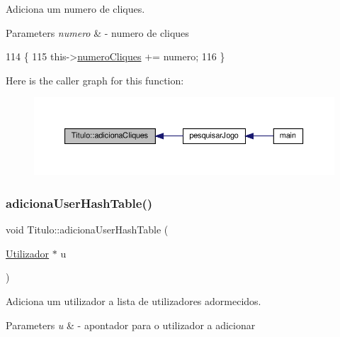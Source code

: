 Adiciona um numero de cliques. 


\begin{DoxyParams}{Parameters}
{\em numero} & -\/ numero de cliques \\
\hline
\end{DoxyParams}

\begin{DoxyCode}
114                                                  \{
115      this->\hyperlink{classTitulo_a7775da325c14a4d76f2d3b0800c28fa3}{numeroCliques} += numero;
116  \}
\end{DoxyCode}
Here is the caller graph for this function\+:
\nopagebreak
\begin{figure}[H]
\begin{center}
\leavevmode
\includegraphics[width=350pt]{classTitulo_a0cf99e4a2b522a7acae425593e87efec_icgraph}
\end{center}
\end{figure}
\mbox{\label{classTitulo_a64300cd5c0c717f77666413127404d36}} 
\subsubsection{\texorpdfstring{adiciona\+User\+Hash\+Table()}{adicionaUserHashTable()}}
{\footnotesize\ttfamily void Titulo\+::adiciona\+User\+Hash\+Table (\begin{DoxyParamCaption}\item[{\hyperlink{classUtilizador}{Utilizador} $\ast$}]{u }\end{DoxyParamCaption})}



Adiciona um utilizador a lista de utilizadores adormecidos. 


\begin{DoxyParams}{Parameters}
{\em u} & -\/ apontador para o utilizador a adicionar \\
\hline
\end{DoxyParams}

